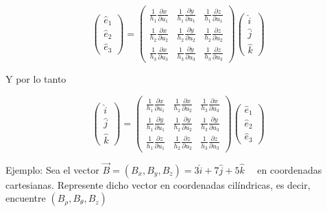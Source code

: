 $$
\left(\begin{array}{l}
\hat{e}_{1} \\
\hat{e}_{2} \\
\hat{e}_{3}
\end{array}\right)=\left(\begin{array}{cccc}
\frac{1}{h_{1}} \frac{\partial x}{\partial u_{1}} & \frac{1}{h_{1}} \frac{\partial y}{\partial u_{1}} & \frac{1}{h_{1}} \frac{\partial z}{\partial u_{1}} \\
\frac{1}{h_{2}} \frac{\partial x}{\partial u_{2}} & \frac{1}{h_{2}} \frac{\partial y}{\partial u_{2}} & \frac{1}{h_{2}} \frac{\partial z}{\partial u_{2}} \\
\frac{1}{h_{3}} \frac{\partial x}{\partial u_{3}} & \frac{1}{h_{3}} \frac{\partial y}{\partial u_{3}} & \frac{1}{h_{3}} \frac{\partial z}{\partial u_{3}}
\end{array}\right)\left(\begin{array}{l}
\hat{i} \\
\hat{j} \\
\hat{k}
\end{array}\right)
$$

Y por lo tanto

$$
\left(\begin{array}{l}
\hat{i} \\
\hat{j} \\
\hat{k}
\end{array}\right)=\left(\begin{array}{cccc}
\frac{1}{h_{1}} \frac{\partial x}{\partial u_{1}} & \frac{1}{h_{2}} \frac{\partial x}{\partial u_{2}} & \frac{1}{h_{3}} \frac{\partial x}{\partial u_{3}} \\
\frac{1}{h_{1}} \frac{\partial y}{\partial u_{1}} & \frac{1}{h_{2}} \frac{\partial y}{\partial u_{2}} & \frac{1}{h_{3}} \frac{\partial y}{\partial u_{3}} \\
\frac{1}{h_{1}} \frac{\partial z}{\partial u_{1}} & \frac{1}{h_{2}} \frac{\partial z}{\partial u_{2}} & \frac{1}{h_{3}} \frac{\partial z}{\partial u_{3}}
\end{array}\right)\left(\begin{array}{l}
\hat{e}_{1} \\
\hat{e}_{2} \\
\hat{e}_{3}
\end{array}\right)
$$

Ejemplo: Sea el vector $\vec{B}=\left(B_{x}, B_{y}, B_{z}\right)=3 \hat{i}+7 \hat{j}+5 \hat{k} \quad$ en coordenadas cartesianas. Represente dicho vector en coordenadas cilíndricas, es decir, encuentre $\left(B_{\rho}, B_{\theta}, B_{z}\right)$

